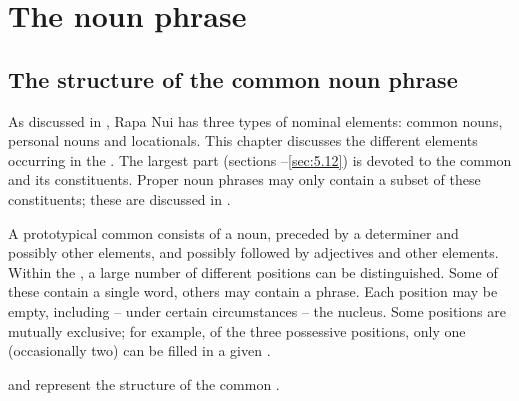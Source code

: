 \chapter[The \isi{noun phrase}]{The noun phrase}\label{ch:5}
\section{The structure of the common noun phrase}\label{sec:5.1}
As discussed in , Rapa Nui has three types of nominal elements: common nouns, personal nouns and locationals. This chapter discusses the different elements occurring in the . The largest part (sections –\ref{sec:5.12}) is devoted to the common  and its constituents. Proper noun phrases may only contain a subset of these constituents; these are discussed in . 

A prototypical common  consists of a noun, preceded by a determiner and possibly other elements, and possibly followed by adjectives and other elements. Within the , a large number of different positions can be distinguished. Some of these contain a single word, others may contain a phrase. Each position may be empty, including – under certain circumstances – the nucleus. Some positions are mutually exclusive; for example, of the three possessive positions, only one (occasionally two) can be filled in a given .

 and  represent the structure of the common . 


